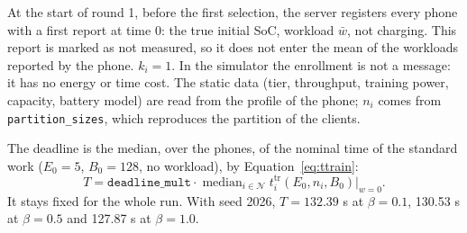 \documentclass[11pt,a4paper]{article}
\newcommand{\cf}[1]{\texttt{#1}}
\begin{document}
At the start of round 1, before the first selection, the server registers every
phone with a first report at time 0: the true initial SoC, workload $\bar{w}$,
not charging. This report is marked as not measured, so it does not enter the
mean of the workloads reported by the phone. $k_i = 1$. In the simulator the
enrollment is not a message: it has no energy or time cost. The static data
(tier, throughput, training power, capacity, battery model) are read from the
profile of the phone; $n_i$ comes from \cf{partition\_sizes}, which
reproduces the partition of the clients.

The deadline is the median, over the phones, of the nominal time of the
standard work ($E_0 = 5$, $B_0 = 128$, no workload), by
Equation~\eqref{eq:ttrain}:
\begin{equation}
  T = \texttt{deadline\_mult} \cdot \operatorname{median}_{i \in \mathcal{N}}
      t^{\mathrm{tr}}_i(E_0, n_i, B_0)\big|_{w = 0} .
\end{equation}
It stays fixed for the whole run. With seed 2026, $T = 132.39$ s at $\beta =
0.1$, 130.53 s at $\beta = 0.5$ and 127.87 s at $\beta = 1.0$.
\end{document}

